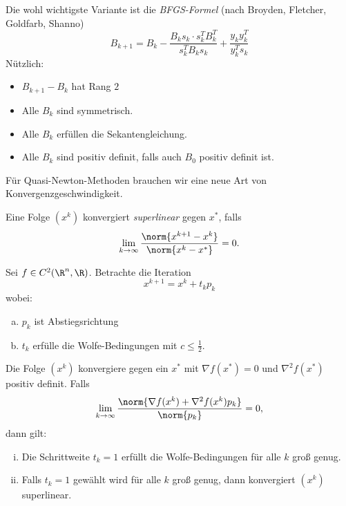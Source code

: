 Die wohl wichtigste Variante ist die \emph{BFGS-Formel} (nach Broyden, Fletcher, Goldfarb, Shanno) \begin{equation*}
	B_{k+1}=B_k-\frac{B_ks_k \cdot s_k^TB_k^T}{s_k^TB_ks_k}+\frac{y_ky_k^T}{y_k^Ts_k}
\end{equation*}
Nützlich: \begin{itemize}
	\item $B_{k+1}-B_k$ hat Rang $2$
	\item Alle $B_k$ sind symmetrisch.
	\item Alle $B_k$ erfüllen die Sekantengleichung.
	\item Alle $B_k$ sind positiv definit, falls auch $B_0$ positiv definit ist.
\end{itemize}
Für Quasi-Newton-Methoden brauchen wir eine neue Art von Konvergenzgeschwindigkeit.
\begin{defi}
Eine Folge $(x^k )$ konvergiert \emph{superlinear} gegen $x^*$, falls
\begin{equation*}
 \lim_{k \to \infty} \frac{\norm{x^{k+1}-x^k}}{\norm{x^k-x^*}}=0.
\end{equation*}
\end{defi}
\begin{satz}
\label{thm:quasi_newton_konvergenz}
Sei $f \in C^2 (\R^n,\R )$. Betrachte die Iteration \begin{equation*}
	x^{k+1}=x^k+t_kp_k
\end{equation*}
wobei:
\begin{enumerate}[a)]
 \item $p_k$ ist Abstiegsrichtung
 \item $t_k$ erfülle die Wolfe-Bedingungen mit $c \leq \frac{1}{2}$.
\end{enumerate}
Die Folge $(x^k )$ konvergiere gegen ein $x^*$ mit $\nabla f (x^* )=0$ und $\nabla^2f (x^* )$ positiv definit. Falls \begin{equation*}
 \lim_{k \to \infty} \frac{\norm{\nabla f(x^k)+\nabla^2 f(x^k )p_k}}{\norm{p_k}}=0,
\end{equation*}
dann gilt:
\begin{enumerate}[i)]
 \item Die Schrittweite $t_k=1$ erfüllt die Wolfe-Bedingungen für alle $k$ groß genug.
 \item Falls $t_k=1$ gewählt wird für alle $k$ groß genug, dann konvergiert $(x^k )$ superlinear.
\end{enumerate}
\end{satz}

